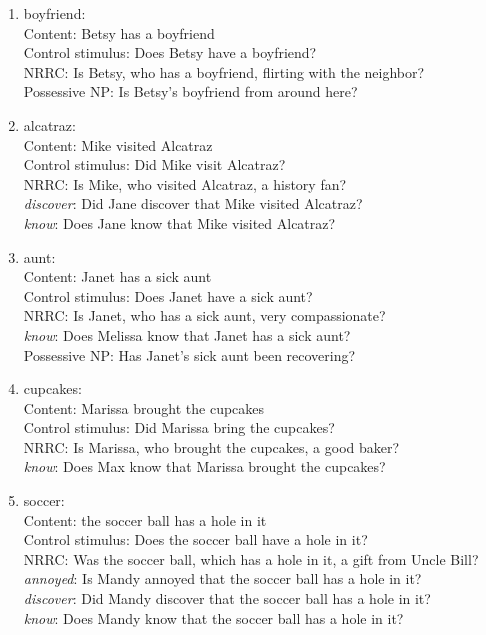 \documentclass[11pt,fleqn]{article}
\newcommand{\6}{\mbox{$[\hspace*{-.6mm}[$}}
\newcommand{\9}{\mbox{$]\hspace*{-.6mm}]$}}
\begin{document}
\begin{enumerate}
\item boyfriend:  \\
     Content: Betsy has a boyfriend\\
     Control stimulus: Does Betsy have a boyfriend?\\
     NRRC: Is Betsy, who has a boyfriend, flirting with the neighbor?\\
     Possessive NP: Is Betsy's boyfriend from around here?

\item alcatraz:  \\
     Content: Mike visited Alcatraz\\
     Control stimulus: Did Mike visit Alcatraz?\\
     NRRC: Is Mike, who visited Alcatraz, a history fan?\\
     {\em discover}: Did Jane discover that Mike visited Alcatraz?\\
     {\em know}: Does Jane know that Mike visited Alcatraz?

\item aunt:  \\
     Content: Janet has a sick aunt\\
     Control stimulus: Does Janet have a sick aunt?\\
     NRRC: Is Janet, who has a sick aunt, very compassionate?\\
     {\em know}: Does Melissa know that Janet has a sick aunt?\\
     Possessive NP: Has Janet's sick aunt been recovering?

\item cupcakes:  \\
     Content: Marissa brought the cupcakes\\
     Control stimulus: Did Marissa bring the cupcakes?\\
     NRRC: Is Marissa, who brought the cupcakes, a good baker?\\
     {\em know}: Does Max know that Marissa brought the cupcakes?

\item soccer:  \\
     Content: the soccer ball has a hole in it\\
     Control stimulus: Does the soccer ball have a hole in it?\\
     NRRC: Was the soccer ball, which has a hole in it, a gift from Uncle Bill?\\
     {\em annoyed}: Is Mandy annoyed that the soccer ball has a hole in it?\\
     {\em discover}: Did Mandy discover that the soccer ball has a hole in it?\\
     {\em know}: Does Mandy know that the soccer ball has a hole in it?


\end{enumerate}
\end{document}
